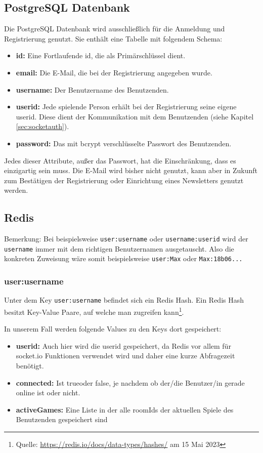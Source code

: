 \subsection{PostgreSQL Datenbank}
Die PostgreSQL Datenbank wird ausschließlich für die Anmeldung und Registrierung genutzt. Sie enthält eine Tabelle mit folgendem Schema:
\begin{itemize}
\item \textbf{id:} Eine Fortlaufende id, die als Primärschlüssel dient.
\item \textbf{email:} Die E-Mail, die bei der Registrierung angegeben wurde.
\item \textbf{username:} Der Benutzername des Benutzenden.
\item \textbf{userid:} Jede spielende Person erhält bei der Registrierung seine eigene userid. Diese dient der Kommunikation mit dem Benutzenden (siehe Kapitel \ref{sec:socketauth}).
\item \textbf{password:} Das mit bcrypt verschlüsselte Passwort des Benutzenden.
\end{itemize}
Jedes dieser Attribute, außer das Passwort, hat die Einschränkung, dass es einzigartig sein muss. Die E-Mail wird bisher nicht genutzt, kann aber in Zukunft zum Bestätigen der Registrierung oder Einrichtung eines Newsletters genutzt werden.

\subsection{Redis}
\label{sec:redis-data}

Bemerkung: Bei beispielsweise \verb|user:username| oder \verb|username:userid| wird der \verb|username| immer mit dem richtigen Benutzernamen ausgetauscht. Also die konkreten Zuweisung wäre somit beispielsweise \verb|user:Max| oder \verb|Max:18b06...|
\subsubsection{user:username}
Unter dem Key \verb|user:username| befindet sich ein Redis Hash. Ein Redis Hash besitzt Key-Value Paare, auf welche man zugreifen kann\footnote{Quelle: \url{https://redis.io/docs/data-types/hashes/} am 15 Mai 2023}.

In unserem Fall werden folgende Values zu den Keys dort gespeichert:
\begin{itemize}
\item \textbf{userid:} Auch hier wird die userid gespeichert, da Redis vor allem für socket.io Funktionen verwendet wird und daher eine kurze Abfragezeit benötigt.
\item \textbf{connected:} Ist \glqq true\grqq{ }oder \glqq false\grqq , je nachdem ob der/die Benutzer/in gerade online ist oder nicht.
\item \textbf{activeGames:} Eine Liste in der alle roomIds der aktuellen Spiele des Benutzenden gespeichert sind
\end{itemize}

